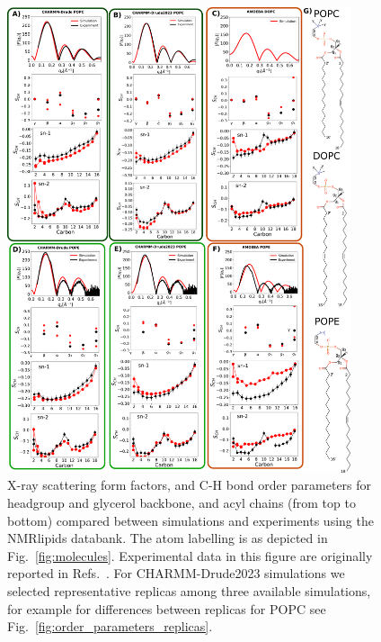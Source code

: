 \documentclass[journal=jacsat,manuscript=article,layout=singlecolumn]{achemso}
\begin{document}
\begin{figure}[!p]
    \centering
    \includegraphics[width=0.9\textwidth]{Figures/quality.pdf}
    \caption{X-ray scattering form factors, and C-H bond order parameters for headgroup and glycerol backbone, and acyl chains (from top to bottom) compared between simulations and experiments using the NMRlipids databank. The atom labelling is as depicted in Fig.~\ref{fig:molecules}. Experimental data in this figure are originally reported in Refs.~. For CHARMM-Drude2023 simulations we selected representative replicas among three available simulations, for example for differences between replicas for POPC see Fig.~\ref{fig:order_parameters_replicas}.}
    \label{fig:order_parameters}

\end{figure}
\end{document}
